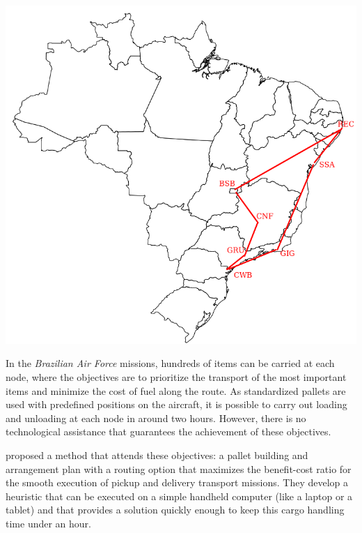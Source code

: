 \documentclass[preprint,authoryear]{elsarticle}
\begin{document}
\begin{table}[H]
\begin{minipage}{0.45\linewidth}
	\end{minipage}\hfill %
	\begin{minipage}{0.50\linewidth}
		\centering
		\includegraphics[scale=0.25]{Images/nodes.png}
		\label{fig:nodes}		
	\end{minipage}
\end{table}


In the {\it Brazilian Air Force}\/ missions, hundreds of items can be carried at each node, where the objectives are to prioritize the transport of the most important items and minimize the cost of fuel along the route. As standardized pallets are used with predefined positions on the aircraft, it is possible to carry out loading and unloading at each node in around two hours. However, there is no technological assistance that guarantees the achievement of these objectives.

\cite{MesquitaSanches2023} proposed a method that attends these objectives: a pallet building and arrangement plan with a routing option that maximizes the benefit-cost ratio for the smooth execution of pickup and delivery transport missions. They develop a heuristic that can be executed on a simple handheld computer (like a laptop or a tablet) and that provides a solution quickly enough to keep this cargo handling time under an hour.
\end{document}
